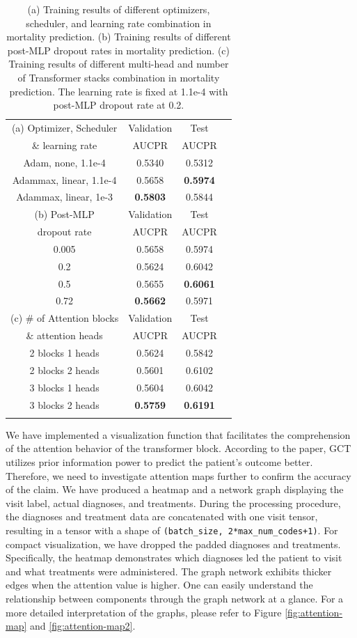 \documentclass[11pt,a4paper]{article}
\begin{document}
\begin{table}[h]
\centering
\begin{tabular}{c c c c}
\Xhline{2\arrayrulewidth}
(a) Optimizer, Scheduler & Validation & Test \\
\& learning rate & AUCPR & AUCPR \\
\hline
Adam, none, 1.1e-4 & 0.5340 & 0.5312 \\
\hline
Adammax, linear, 1.1e-4 & 0.5658 & \textbf{0.5974} \\
\hline
Adammax, linear, 1e-3 & \textbf{0.5803} & 0.5844 \\
\Xhline{2\arrayrulewidth}
(b) Post-MLP & Validation & Test \\
dropout rate & AUCPR & AUCPR \\
\hline
0.005 & 0.5658 & 0.5974 \\
\hline
0.2 & 0.5624 & 0.6042 \\
\hline
0.5 & 0.5655 & \textbf{0.6061} \\
\hline
0.72 & \textbf{0.5662} & 0.5971 \\
\Xhline{2\arrayrulewidth}
(c) \# of Attention blocks & Validation & Test \\
\& attention heads & AUCPR & AUCPR \\
\hline
2 blocks 1 heads & 0.5624 & 0.5842 \\
\hline
2 blocks 2 heads & 0.5601 & 0.6102\\
\hline
3 blocks 1 heads & 0.5604 & 0.6042\\
\hline
3 blocks 2 heads & \textbf{0.5759} & \textbf{0.6191}\\
\Xhline{2\arrayrulewidth}
\end{tabular}
\caption{(a) Training results of different optimizers, scheduler, and learning rate combination in mortality prediction. (b) Training results of different post-MLP dropout rates in mortality prediction. (c) Training results of different multi-head and number of Transformer stacks combination in mortality prediction. The learning rate is fixed at 1.1e-4 with post-MLP dropout rate at 0.2.}
\label{tab:tableExp}
\end{table} 

We have implemented a visualization function that facilitates the comprehension of the attention behavior of the transformer block. According to the paper, GCT utilizes prior information power to predict the patient’s outcome better. Therefore, we need to investigate attention maps further to confirm the accuracy of the claim. We have produced a heatmap and a network graph displaying the visit label, actual diagnoses, and treatments. During the processing procedure, the diagnoses and treatment data are concatenated with one visit tensor, resulting in a tensor with a shape of \texttt{(batch\_size, 2*max\_num\_codes+1)}. For compact visualization, we have dropped the padded diagnoses and treatments. Specifically, the heatmap demonstrates which diagnoses led the patient to visit and what treatments were administered. The graph network exhibits thicker edges when the attention value is higher. One can easily understand the relationship between components through the graph network at a glance. For a more detailed interpretation of the graphs, please refer to Figure \ref{fig:attention-map} and \ref{fig:attention-map2}.
\end{document}
